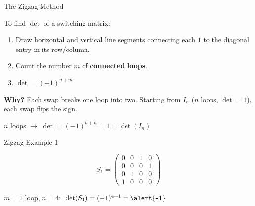 \documentclass[10pt]{beamer}
\theoremstyle{definition}
\newcommand{\x}[1]{\alert{\textbf{#1}}}
\begin{document}
\begin{frame}[fragile]{The Zigzag Method}

To find $\det$ of a switching matrix:

\vfill

\begin{enumerate}
\item Draw horizontal and vertical line segments connecting each $1$ to the diagonal entry in its row/column.
\vfill
\item Count the number $m$ of \x{connected loops}.
\vfill
\item $\det = (-1)^{n+m}$
\end{enumerate}

\vfill

\textbf{Why?} Each swap breaks one loop into two. Starting from $I_n$ ($n$ loops, $\det=1$), each swap flips the sign.

\vfill

$n$ loops $\to$ $\det = (-1)^{n+n} = 1 = \det(I_n)$ \checkmark

\end{frame}


\begin{frame}[fragile]{Zigzag Example 1}

$$
S_1 = \begin{pmatrix} 0 & 0 & 1 & 0 \\ 0 & 0 & 0 & 1 \\ 0 & 1 & 0 & 0 \\ 1 & 0 & 0 & 0 \end{pmatrix}
$$

\vfill

\begin{center}
\end{center}

\vfill

$m = 1$ loop, $n=4$: $\;\det(S_1) = (-1)^{4+1} = \x{-1}$

\end{frame}
\end{document}
